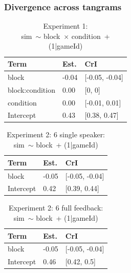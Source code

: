 \documentclass[
  english,
  a4paper,
]{article}
\begin{document}
\pagebreak

\hypertarget{divergence-across-tangrams}{%
\subsubsection{Divergence across tangrams}\label{divergence-across-tangrams}}

\begin{table}[h!]

\caption{\label{tab:unnamed-chunk-17}Experiment 1:\\ sim~$\sim$ block~$\times$ condition~+ (1|gameId)}
\centering
\begin{tabular}[t]{lll}
\toprule
Term & Est. & CrI\\
\midrule
block & -0.04 & {}[-0.05, -0.04]\\
block:condition & 0.00 & {}[0, 0]\\
condition & 0.00 & {}[-0.01, 0.01]\\
Intercept & 0.43 & {}[0.38, 0.47]\\
\bottomrule
\end{tabular}
\end{table}

\begin{table}[h!]

\caption{\label{tab:unnamed-chunk-17}Experiment 2: 6 single speaker:\\ sim~$\sim$ block~+ (1|gameId)}
\centering
\begin{tabular}[t]{lll}
\toprule
Term & Est. & CrI\\
\midrule
block & -0.05 & {}[-0.05, -0.04]\\
Intercept & 0.42 & {}[0.39, 0.44]\\
\bottomrule
\end{tabular}
\end{table}

\begin{table}[h!]

\caption{\label{tab:unnamed-chunk-17}Experiment 2: 6 full feedback:\\ sim~$\sim$ block~+ (1|gameId)}
\centering
\begin{tabular}[t]{lll}
\toprule
Term & Est. & CrI\\
\midrule
block & -0.05 & {}[-0.05, -0.04]\\
Intercept & 0.46 & {}[0.42, 0.5]\\
\bottomrule
\end{tabular}
\end{table}
\end{document}
